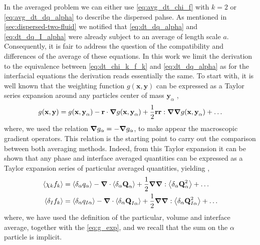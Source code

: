 

In the averaged problem we can either use \ref{eq:avg_dt_chi_f} with $k=2$ or \ref{eq:avg_dt_dq_alpha} to describe the dispersed pahse. 
As mentioned in \ref{sec:dispersed-two-fluid} we notified that \ref{eq:dt_dq_alpha} and \ref{eq:dt_dq_I_alpha} were already subject to an average of length scale $a$. 
Consequently, it is fair to address the question of the compatibility and differences of the average of these equations. 
In this work we limit the derivation to the equivalence between \ref{eq:dt_chi_k_f_k} and \ref{eq:dt_dq_alpha} as for the interfacial equations the derivation reads essentially the same. 
To start with, it is well known that the weighting function $g(\textbf{x},\textbf{y})$ can be expressed as a Taylor series expansion around any particles center of mass $\textbf{y}_\alpha$ \citep{jackson1997locally},
\begin{equation}
    g(\textbf{x},\textbf{y})
    = g(\textbf{x},\textbf{y}_\alpha)
    - \textbf{r} \cdot \bm{\nabla} g(\textbf{x},\textbf{y}_\alpha)
    + \frac{1}{2} \textbf{r}\textbf{r} : \bm{\nabla}\bm{\nabla} g(\textbf{x},\textbf{y}_\alpha)
    + \ldots
    \label{eq:g_exp}
\end{equation} 
where, we used the relation $\bm{\nabla} g_\alpha = - \bm{\nabla} g_\alpha$, to make appear the macroscopic gradient operators. 
This relation is the starting point to carry out the comparison between both averaging methods. 
Indeed, from this Taylor expansion it can be shown that any phase and interface averaged quantities can be expressed as a Taylor expansion series of particular averaged quantities, yielding \citep{jackson1997locally},
\begin{align}
    \left<\chi_kf_k\right> 
    &=  \left<\delta_\alpha q_\alpha\right>
        - \bm{\nabla} \cdot  
        \left<\delta_\alpha \textbf{Q}_\alpha\right>        
        + \frac{1}{2} \bm{\nabla}\bm{\nabla} : \left<\delta_\alpha \textbf{Q}_\alpha^2\right>
        + \ldots  \\
    \left<\delta_I f_k\right> 
    &=  \left<\delta_\alpha q_{I\alpha}\right>        
        - \bm{\nabla} \cdot \left<\delta_\alpha \textbf{Q}_{I\alpha}\right>
        + \frac{1}{2} \bm{\nabla}\bm{\nabla} : \left<\delta_\alpha \textbf{Q}_{I\alpha}^{2}\right>
        + \ldots  
    \label{eq:f_exp}
\end{align}      
where, we have used the definition of the particular, volume and interface average, together with the \ref{eq:g_exp}, and we recall that the sum on the $\alpha$ particle is implicit. 

